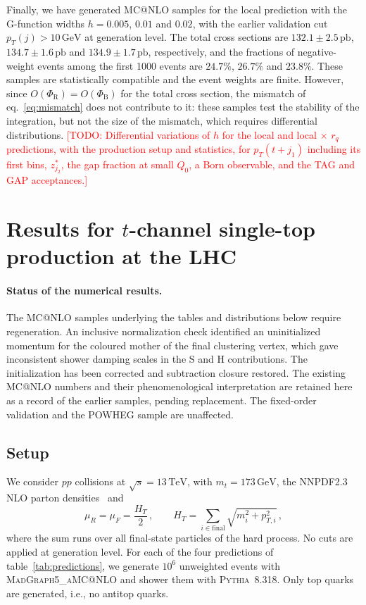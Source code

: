 \documentclass[a4paper,11pt]{article}
\makeatletter
\newcommand{\TeV}{\ensuremath{\,\text{TeV}}}
\newcommand{\GeV}{\ensuremath{\,\text{GeV}}}
\newcommand{\pb}{\ensuremath{\,\text{pb}}}
\newcommand{\pT}{p_T}
\newcommand{\mgamc}{\textsc{MadGraph5\_aMC@NLO}\xspace}
\newcommand{\PhiB}{\Phi_{\mathrm{B}}}
\newcommand{\PhiR}{\Phi_{\mathrm{R}}}
\newcommand{\loc}{local\xspace}
\newcommand{\locq}{local$\,{\times}\,r_q$\xspace}
\newcommand{\todo}[1]{\textcolor{red}{[TODO: #1]}}
\makeatother
\begin{document}
Finally, we have generated MC@NLO samples for the \loc prediction with
the G-function widths $h=0.005$, $0.01$ and $0.02$, with the earlier
validation cut $\pT(j)>10\GeV$ at generation level. The total cross sections are
$132.1\pm2.5\pb$, $134.7\pm1.6\pb$ and $134.9\pm1.7\pb$, respectively,
and the fractions of negative-weight events among the first 1000 events
are $24.7\%$, $26.7\%$ and $23.8\%$. These samples are statistically
compatible and the event weights are finite. However, since
$O(\PhiR)=O(\PhiB)$ for the total cross section, the mismatch of
eq.~\eqref{eq:mismatch} does not contribute to it: these samples test
the stability of the integration, but not the size of the mismatch,
which requires differential distributions. \todo{Differential
  variations of $h$ for the \loc and \locq predictions, with the
  production setup and statistics, for $\pT(t+j_1)$ including its first
  bins, $z^*_{j_2}$, the gap fraction at small $Q_0$, a Born observable,
  and the TAG and GAP acceptances.}


\section{Results for \texorpdfstring{$t$}{t}-channel single-top production at the LHC}
\label{sec:results}

\paragraph{Status of the numerical results.}
The MC@NLO samples underlying the tables and distributions below require
regeneration. An inclusive normalization check identified an uninitialized
momentum for the coloured mother of the final clustering vertex, which
gave inconsistent shower damping scales in the S and H contributions.
The initialization has been corrected and subtraction closure restored.
The existing MC@NLO numbers and their phenomenological interpretation
are retained here as a record of the earlier samples, pending replacement.
The fixed-order validation and the POWHEG sample are unaffected.

\subsection{Setup}
\label{sec:setup}

We consider $pp$ collisions at $\sqrt{s}=13\TeV$, with $m_t=173\GeV$,
the NNPDF2.3 NLO parton densities~\cite{Ball:2012cx} and
\begin{equation}
  \mu_R=\mu_F=\frac{H_T}{2}\,,\qquad
  H_T=\sum_{i\in\mathrm{final}}\sqrt{m_i^2+p_{T,i}^2}\,,
  \label{eq:scales}
\end{equation}
where the sum runs over all final-state particles of the hard
process. No cuts are applied at generation level. For each of the four
predictions of table~\ref{tab:predictions}, we generate $10^6$
unweighted events with \mgamc and shower them with \textsc{Pythia}~8.318.
Only top quarks are generated, i.e., no antitop quarks.
\end{document}
